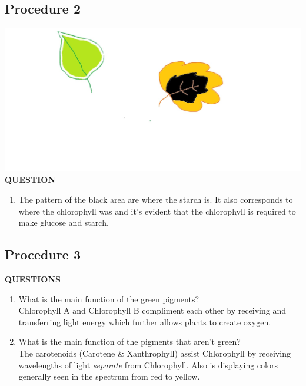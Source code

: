 \documentclass{article}
\begin{document}
\subsection{Procedure 2}
\includegraphics[width=\textwidth]{lab.jpg}
\textbf{QUESTION}
\begin{enumerate}[label=\textbf{\arabic*.}]
	\item The pattern of the black area are where the starch is. It also corresponds to where the chlorophyll was and it's evident that the chlorophyll is required to make glucose and starch.
\end{enumerate}

\subsection{Procedure 3}
\textbf{QUESTIONS}
\begin{enumerate}[label=\textbf{\arabic*.}]
	\item What is the main function of the green pigments? \\
		Chlorophyll A and Chlorophyll B compliment each other by receiving and transferring light energy which further allows plants to create oxygen.
	\item What is the main function of the pigments that aren't green? \\
		The carotenoids (Carotene \& Xanthrophyll) assist Chlorophyll by receiving wavelengths of light \textit{separate} from Chlorophyll. Also is displaying colors generally seen in the spectrum from red to yellow.
\end{enumerate}
\end{document}
